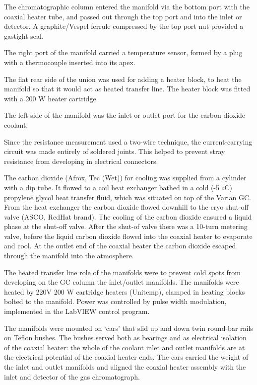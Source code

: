 \documentclass[aip,rsi,preprint,graphicx]{revtex4-1} %
\begin{document}
The chromatographic column entered the manifold via the bottom port with the coaxial heater tube, and passed out through the top port and into the inlet or detector. A graphite/Vespel ferrule compressed by the top port nut provided a gastight seal.

The right port of the manifold carried a temperature sensor, formed by a plug with a thermocouple inserted into its apex.

The flat rear side of the union was used for adding a heater block, to heat the manifold so that it would act as heated transfer line. The heater block was fitted with a 200 W heater cartridge. 

The left side of the manifold was the inlet or outlet port for the carbon dioxide coolant. 

Since the resistance measurement used a two-wire technique, the current-carrying circuit was made entirely of soldered joints. This helped to prevent stray resistance from developing in electrical connectors. 

The carbon dioxide (Afrox, Tec (Wet)) for cooling was supplied from a cylinder with a dip tube. It flowed to a coil heat exchanger bathed in a cold (-5 $\circ$C) propylene glycol heat transfer fluid, which was situated on top of the Varian GC. From the heat exchanger the carbon dioxide flowed downhill to the cryo shut-off valve (ASCO, RedHat brand). The cooling of the carbon dioxide ensured a liquid phase at the shut-off valve. After the shut-of valve there was a 10-turn metering valve, before the liquid carbon dioxide flowed into the coaxial heater to evaporate and cool. At the outlet end of the coaxial heater the carbon dioxide escaped through the manifold into the atmosphere. 

The heated transfer line role of the manifolds were to prevent cold spots from developing on the GC column the inlet/outlet manifolds. The manifolds were heated by 220V 200 W cartridge heaters (Unitemp), clamped in heating blocks bolted to the manifold. Power was controlled by pulse width modulation, implemented in the LabVIEW control program.

The manifolds were mounted on `cars' that slid up and down twin round-bar rails on Teflon bushes. The bushes served both as bearings and as electrical isolation of the coaxial heater: the whole of the coolant inlet and outlet manifolds are at the electrical potential of the coaxial heater ends. The cars carried the weight of the inlet and outlet manifolds and aligned the coaxial heater assembly with the inlet and detector of the gas chromatograph. 
\end{document}
